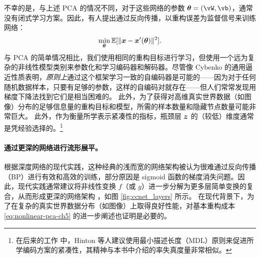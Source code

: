 \documentclass[../../book-main_zh.tex]{subfiles}
\begin{document}
不幸的是，与上述 PCA 的情况不同，对于这些网络的参数 $\boldsymbol{\theta} = (\vW, \vb)$，通常没有闭式学习方案。因此，有人提出通过反向传播，以重构误差为监督信号来训练网络：
\begin{equation}\label{eq:nonlinear-pca-ch5}
  \min_{\boldsymbol{\theta}} \mathbb{E}[ \|\bm{x} - \bm{x}'(\boldsymbol{\theta})\|^2].
\end{equation}
与 PCA 的简单情况相比，我们使用相同的重构目标进行学习，但使用一个远为复杂的非线性模型类别来参数化和学习编码器和解码器。尽管像 Cybenko 的通用逼近性质表明，\textit{原则上}通过这个框架学习一致的自编码器是可能的——因为对于任何随机数据样本，只要有足够的参数，这样的自编码对就存在——但人们常常发现用梯度下降法找到它们是相当困难的。
此外，为了获得对高维真实世界数据（如图像）分布的足够信息量的重构目标和模型，所需的样本数量和隐藏节点数量可能非常巨大。
此外，作为衡量所学表示紧凑性的指标，瓶颈层 $\bm{z}$ 的（较低）维度通常是凭经验选择的。\footnote{在后来的工作 \cite{Hinton-1993} 中，Hinton 等人建议使用最小描述长度（MDL）原则来促进所学编码方案的紧凑性，其精神与本书中介绍的率失真度量非常相似。}

\paragraph{通过更深的网络进行流形展平。}
根据深度网络的现代实践，这种经典的浅而宽的网络架构被认为很难通过反向传播（BP）进行有效和高效的训练，部分原因是 sigmoid 函数的梯度消失问题。因此，现代实践通常建议将非线性变换 $f$（或 $g$）进一步分解为更多层简单变换的复合，从而形成更深的网络架构 \cite{Hinton504}，如图 \ref{fig:ccnet_layers} 所示。
在现代背景下，为了在复杂的真实世界数据分布（如图像）上取得良好性能，对基本重构成本 \eqref{eq:nonlinear-pca-ch5} 的进一步阐述也证明是必要的。
\end{document}
